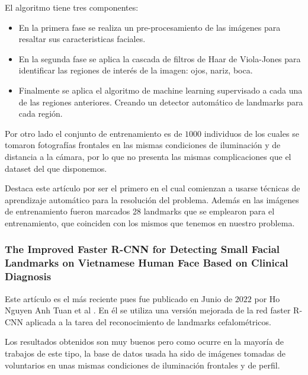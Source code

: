                 \medskip

                \noindent El algoritmo tiene tres componentes:

                \begin{itemize}
                    \item En la primera fase se realiza un pre-procesamiento de las imágenes para resaltar sus caracteristicas faciales. 
                    \item En la segunda fase se aplica la cascada de filtros de Haar de Viola-Jones para identificar las regiones de interés de la imagen: ojos, nariz, boca.
                    \item Finalmente se aplica el algoritmo de machine learning supervisado a cada una de las regiones anteriores. Creando un detector automático de landmarks para cada región.
                \end{itemize}

                \medskip

                \noindent Por otro lado el conjunto de entrenamiento es de $1000$ individuos de los cuales se tomaron fotografías frontales en las mismas condiciones de iluminación y de distancia a la cámara, por lo que no presenta las mismas complicaciones que el dataset del que disponemos. 

                \medskip

                \noindent Destaca este artículo por ser el primero en el cual comienzan a usarse técnicas de aprendizaje automático para la resolución del problema. Además en las imágenes de entrenamiento fueron marcados 28 landmarks que se emplearon para el entrenamiento, que coinciden con los mismos que tenemos en nuestro problema.

            \subsubsection{The Improved Faster R-CNN for Detecting Small Facial Landmarks on Vietnamese Human Face Based on Clinical Diagnosis}
            
                \noindent Este artículo es el más reciente pues fue publicado en Junio de $2022$ por Ho Nguyen Anh Tuan et al \cite{ImprovedfasterRCNN}. En él se utiliza una versión mejorada de la red faster R-CNN aplicada a la tarea del reconocimiento de landmarks cefalométricos. 

                \medskip

                \noindent Los resultados obtenidos son muy buenos pero como ocurre en la mayoría de trabajos de este tipo, la base de datos usada ha sido de imágenes tomadas de voluntarios en unas mismas condiciones de iluminación frontales y de perfil. 

